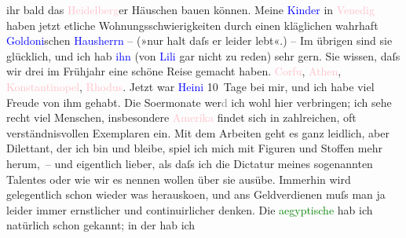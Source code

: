                ihr bald das \textcolor{pink}{Heidelberg}{}\ledrightnote{\textcolor{pink}{Heidelberg}}er Häuschen bauen können.
               Meine \textcolor{blue}{Kinder}{} in \textcolor{pink}{Venedig}{}\ledrightnote{\textcolor{pink}{Venedig}} haben jetzt etliche Wohnungsschwierigkeiten
               durch einen kläglichen wahrhaft \textcolor{blue}{Goldoni}{}\ledrightnote{\textcolor{blue}{Carlo Goldoni}}schen \textcolor{blue}{Hausherrn}{} – (»nur halt daſs er
               leider lebt«.) – Im übrigen sind sie glücklich, und ich hab \textcolor{blue}{ihn}{} (von \textcolor{blue}{Lili}{}\ledrightnote{\textcolor{blue}{Lili Schnitzler}} gar nicht zu reden) sehr gern. Sie wissen, daſs wir drei im Frühjahr
               eine schöne Reise gemacht haben. \textcolor{pink}{Corfu}{}\ledrightnote{\textcolor{pink}{Korfu}}, \textcolor{pink}{Athen}{}\ledrightnote{\textcolor{pink}{Athen}}, \textcolor{pink}{Kon{\pb}stantinopel}{}\ledrightnote{\textcolor{pink}{Istanbul}}, \textcolor{pink}{Rhodus}{}\ledrightnote{\textcolor{pink}{Rhodos}}. Jetzt war \textcolor{blue}{Heini}{}\ledrightnote{\textcolor{blue}{Heinrich Schnitzler}} 10 Tage bei mir,
               und ich habe viel Freude von ihm gehabt.\pend
           \pstart
           Die So{\geminationm}ermonate wer\textcolor{gray}{d} ich wohl hier
               verbringen; ich sehe recht viel Menschen, insbesondere \textcolor{pink}{Amerika}{}\ledrightnote{\textcolor{pink}{Amerika}} findet sich in zahlreichen, oft verständnisvollen Exemplaren ein.
               Mit dem Arbeiten geht es ganz leidlich, aber Dilettant, der ich bin und bleibe, spiel
               ich mich mit Figuren und Stoffen mehr herum, – und eigentlich lieber, als daſs ich
               die Dictatur meines sogenannten Talentes oder wie wir es nennen wollen über sie
               ausübe. Immerhin wird gelegentlich schon wieder was herausko{\geminationm}en, und ans Geldverdienen muſs man ja leider immer
               ernstlicher und continuirlicher denken.\pend
           \pstart
           Die \textcolor{green}{aegyptische}{} hab ich natürlich
               schon gekannt; in der \label{K_L02504_1v}\label{K_L02504_1h} hab ich
